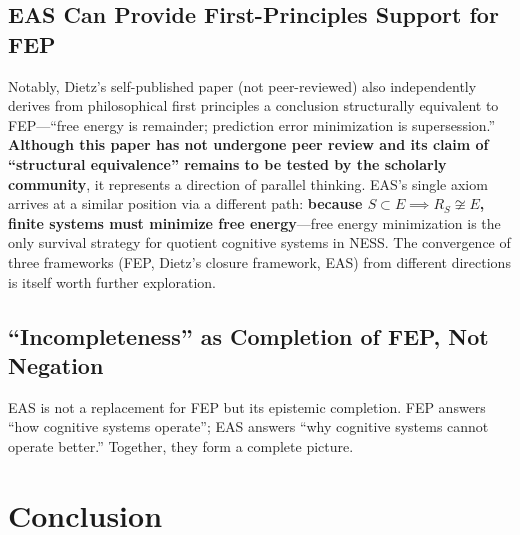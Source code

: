 \documentclass[11pt,a4paper]{article}
\begin{document}
\subsection{EAS Can Provide First-Principles Support for FEP}

Notably, Dietz's self-published paper (not peer-reviewed) \cite{dietz} also independently derives from philosophical first principles a conclusion structurally equivalent to FEP---``free energy is remainder; prediction error minimization is supersession.'' \textbf{Although this paper has not undergone peer review and its claim of ``structural equivalence'' remains to be tested by the scholarly community}, it represents a direction of parallel thinking. EAS's single axiom arrives at a similar position via a different path: \textbf{because $S \subset E \implies R_S \not\cong E$, finite systems must minimize free energy}---free energy minimization is the only survival strategy for quotient cognitive systems in NESS. The convergence of three frameworks (FEP, Dietz's closure framework, EAS) from different directions is itself worth further exploration.

\subsection{``Incompleteness'' as Completion of FEP, Not Negation}

EAS is not a replacement for FEP but its epistemic completion. FEP answers ``how cognitive systems operate''; EAS answers ``why cognitive systems cannot operate better.'' Together, they form a complete picture.

\section{Conclusion}
\end{document}
